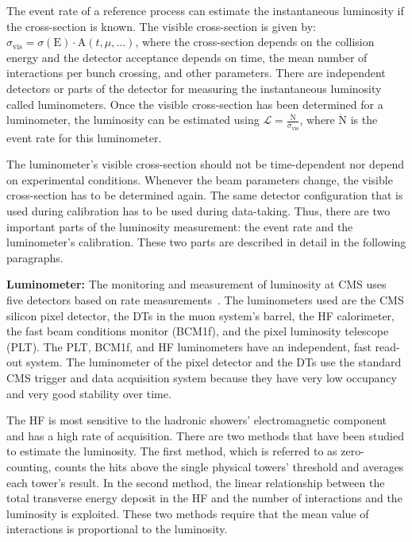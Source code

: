 The event rate of a reference process can estimate the instantaneous luminosity if the cross-section is known. The visible cross-section is given by: $\sigma_{\text{vis}}=\sigma(\text{E}) \cdot \text{A}(t, \mu, \ldots)$, where the cross-section depends on the collision energy and the detector acceptance depends on time, the mean number of interactions per bunch crossing, and other parameters. There are independent detectors or parts of the detector for measuring the instantaneous luminosity called luminometers. Once the visible cross-section has been determined for a luminometer, the luminosity can be estimated using $\mathcal{L}=\frac{\dot{\text{N}}}{\sigma_{\text{vis}}}$, where $\dot{\text{N}}$ is the event rate for this luminometer.

The luminometer's visible cross-section should not be time-dependent nor depend on experimental conditions. Whenever the beam parameters change, the visible cross-section has to be determined again. The same detector configuration that is used during calibration has to be used during data-taking. Thus, there are two important parts of the luminosity measurement: the event rate and the luminometer's calibration. These two parts are described in detail in the following paragraphs.

\textbf{Luminometer:} The monitoring and measurement of luminosity at CMS uses five detectors based on rate measurements~\cite{CMS:2019jhq, CMS:2018elu, CMS:2017sdi}. The luminometers used are the CMS silicon pixel detector, the DTs in the muon system's barrel, the HF calorimeter, the fast beam conditions monitor (BCM1f), and the pixel luminosity telescope (PLT). The PLT, BCM1f, and HF luminometers have an independent, fast read-out system. The luminometer of the pixel detector and the DTs use the standard CMS trigger and data acquisition system because they have very low occupancy and very good stability over time.

The HF is most sensitive to the hadronic showers' electromagnetic component and has a high rate of acquisition. There are two methods that have been studied to estimate the luminosity. The first method, which is referred to as zero-counting, counts the hits above the single physical towers' threshold and averages each tower's result. In the second method, the linear relationship between the total transverse energy deposit in the HF and the number of interactions and the luminosity is exploited. These two methods require that the mean value of interactions is proportional to the luminosity.

